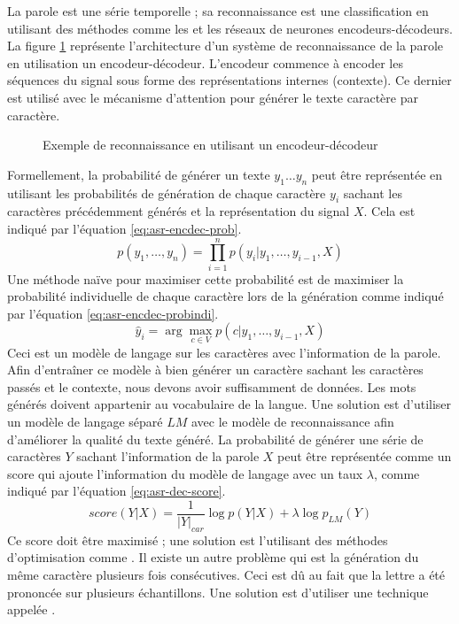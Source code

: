 \documentclass{KodeBook}
\begin{document}
La parole  est une série temporelle ; sa reconnaissance est une classification en utilisant des méthodes comme les  et les réseaux de neurones encodeurs-décodeurs.
La figure \ref{fig:asr-enc-dec} représente l'architecture d'un système de reconnaissance de la parole en utilisation un encodeur-décodeur. 
L'encodeur commence à encoder les séquences du signal sous forme des représentations internes (contexte). 
Ce dernier est utilisé avec le mécanisme d'attention pour générer le texte caractère par caractère.

\begin{figure}[!ht]
	\centering
	\caption[Exemple de reconnaissance en utilisant un encodeur-décodeur]{Exemple de reconnaissance en utilisant un encodeur-décodeur \cite{2020-jurafsky-martin}}
	\label{fig:asr-enc-dec}
\end{figure}

Formellement, la probabilité de générer un texte $y_1 \ldots y_n$ peut être représentée en utilisant les probabilités de génération de chaque caractère $y_i$ sachant les caractères précédemment générés et la représentation du signal $X$. 
Cela est indiqué par l'équation \ref{eq:asr-encdec-prob}.
\begin{equation}\label{eq:asr-encdec-prob}
p(y_1, \ldots, y_n) = \prod\limits_{i=1}^n p(y_i| y_1, \ldots, y_{i-1}, X)
\end{equation}
Une méthode naïve pour maximiser cette probabilité est de maximiser la probabilité individuelle de chaque caractère lors de la génération comme indiqué par l'équation \ref{eq:asr-encdec-probindi}.
\begin{equation}\label{eq:asr-encdec-probindi}
\hat{y}_i = \arg\max_{c \in V} p(c| y_1, \ldots, y_{i-1}, X)
\end{equation}
Ceci est un modèle de langage sur les caractères avec l'information de la parole. 
Afin d'entraîner ce modèle à bien générer un caractère sachant les caractères passés et le contexte, nous devons avoir suffisamment de données. 
Les mots générés doivent appartenir au vocabulaire de la langue.
Une solution est d'utiliser un modèle de langage séparé $LM$ avec le modèle de reconnaissance afin d'améliorer la qualité du texte généré.
La probabilité de générer une série de caractères $Y$ sachant l'information de la parole $X$ peut être représentée comme un score qui ajoute l'information du modèle de langage avec un taux $\lambda$, comme indiqué par l'équation \ref{eq:asr-dec-score}.
\begin{equation}\label{eq:asr-dec-score}
score(Y|X) = \frac{1}{|Y|_{car}} \log p(Y|X) + \lambda \log p_{LM}(Y)
\end{equation}
Ce score doit être maximisé ; une solution est l'utilisant des méthodes d'optimisation comme .
Il existe un autre problème qui est la génération du même caractère plusieurs fois consécutives. 
Ceci est dû au fait que la lettre a été prononcée sur plusieurs échantillons. 
Une solution est d'utiliser une technique appelée .
\end{document}
